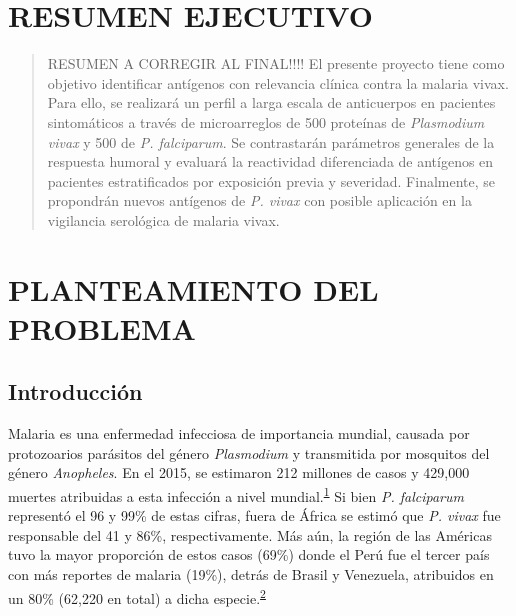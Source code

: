 \documentclass[]{article}
\begin{document}
\vfill
\restoregeometry
\clearpage

\newpage

\tableofcontents

\newpage


\section{RESUMEN EJECUTIVO}\label{resumen-ejecutivo}

\begin{quote}
RESUMEN A CORREGIR AL FINAL!!!! El presente proyecto tiene como objetivo
identificar antígenos con relevancia clínica contra la malaria vivax.
Para ello, se realizará un perfil a larga escala de anticuerpos en
pacientes sintomáticos a través de microarreglos de 500 proteínas de
\emph{Plasmodium vivax} y 500 de \emph{P. falciparum}. Se contrastarán
parámetros generales de la respuesta humoral y evaluará la reactividad
diferenciada de antígenos en pacientes estratificados por exposición
previa y severidad. Finalmente, se propondrán nuevos antígenos de
\emph{P. vivax} con posible aplicación en la vigilancia serológica de
malaria vivax.
\end{quote}

\section{PLANTEAMIENTO DEL PROBLEMA}\label{planteamiento-del-problema}

\subsection{Introducción}\label{intro}

Malaria es una enfermedad infecciosa de importancia mundial, causada por
protozoarios parásitos del género \emph{Plasmodium} y transmitida por
mosquitos del género \emph{Anopheles}. En el 2015, se estimaron 212
millones de casos y 429,000 muertes atribuidas a esta infección a nivel
mundial.\textsuperscript{\protect\hyperlink{ref-WHO2016world}{1}} Si
bien \emph{P. falciparum} representó el 96 y 99\% de estas cifras, fuera
de África se estimó que \emph{P. vivax} fue responsable del 41 y 86\%,
respectivamente. Más aún, la región de las Américas tuvo la mayor
proporción de estos casos (69\%) donde el Perú fue el tercer país con
más reportes de malaria (19\%), detrás de Brasil y Venezuela, atribuidos
en un 80\% (62,220 en total) a dicha
especie.\textsuperscript{\protect\hyperlink{ref-rosas2016peru}{2}}
\end{document}
